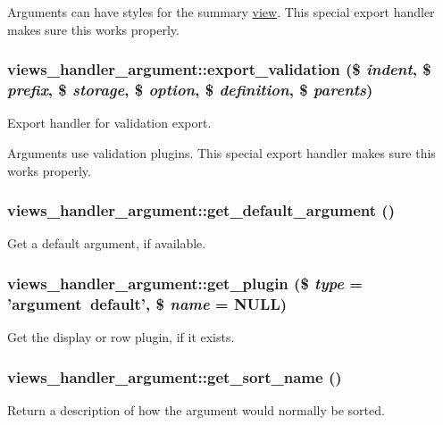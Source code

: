 Arguments can have styles for the summary \hyperlink{classview}{view}. This special export handler makes sure this works properly. \hypertarget{classviews__handler__argument_ae7af6b1580463f3795b0ef6d8add3d2e}{
\subsubsection[{export\_\-validation}]{\setlength{\rightskip}{0pt plus 5cm}views\_\-handler\_\-argument::export\_\-validation (\$ {\em indent}, \/  \$ {\em prefix}, \/  \$ {\em storage}, \/  \$ {\em option}, \/  \$ {\em definition}, \/  \$ {\em parents})}}
\label{classviews__handler__argument_ae7af6b1580463f3795b0ef6d8add3d2e}
Export handler for validation export.

Arguments use validation plugins. This special export handler makes sure this works properly. \hypertarget{classviews__handler__argument_a4362d110d5cb6c7aa46770974289dbaf}{
\subsubsection[{get\_\-default\_\-argument}]{\setlength{\rightskip}{0pt plus 5cm}views\_\-handler\_\-argument::get\_\-default\_\-argument ()}}
\label{classviews__handler__argument_a4362d110d5cb6c7aa46770974289dbaf}
Get a default argument, if available. \hypertarget{classviews__handler__argument_adbb01e1a343a75f2ad3ecbf91bbbef05}{
\subsubsection[{get\_\-plugin}]{\setlength{\rightskip}{0pt plus 5cm}views\_\-handler\_\-argument::get\_\-plugin (\$ {\em type} = {\ttfamily 'argument~default'}, \/  \$ {\em name} = {\ttfamily NULL})}}
\label{classviews__handler__argument_adbb01e1a343a75f2ad3ecbf91bbbef05}
Get the display or row plugin, if it exists. \hypertarget{classviews__handler__argument_a9fad9ab1a7aaa5915baf13a2872faa70}{
\subsubsection[{get\_\-sort\_\-name}]{\setlength{\rightskip}{0pt plus 5cm}views\_\-handler\_\-argument::get\_\-sort\_\-name ()}}
\label{classviews__handler__argument_a9fad9ab1a7aaa5915baf13a2872faa70}
Return a description of how the argument would normally be sorted.

